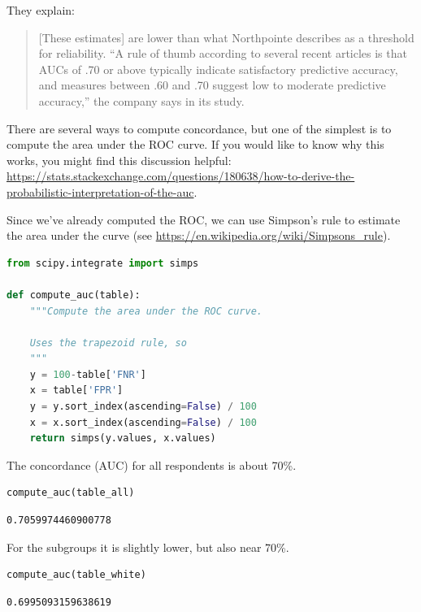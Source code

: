 They explain:

\begin{quote}
{[}These estimates{]} are lower than what Northpointe describes as a
threshold for reliability. ``A rule of thumb according to several recent
articles is that AUCs of .70 or above typically indicate satisfactory
predictive accuracy, and measures between .60 and .70 suggest low to
moderate predictive accuracy,'' the company says in its study.
\end{quote}

There are several ways to compute concordance, but one of the simplest
is to compute the area under the ROC curve. If you would like to know
why this works, you might find this discussion helpful:
\url{https://stats.stackexchange.com/questions/180638/how-to-derive-the-probabilistic-interpretation-of-the-auc}.

Since we've already computed the ROC, we can use Simpson's rule to
estimate the area under the curve (see
\url{https://en.wikipedia.org/wiki/Simpsons_rule}).

\begin{lstlisting}[language=Python,style=source]
from scipy.integrate import simps

def compute_auc(table):
    """Compute the area under the ROC curve.
    
    Uses the trapezoid rule, so 
    """
    y = 100-table['FNR']
    x = table['FPR']
    y = y.sort_index(ascending=False) / 100
    x = x.sort_index(ascending=False) / 100
    return simps(y.values, x.values)
\end{lstlisting}

The concordance (AUC) for all respondents is about 70\%.

\begin{lstlisting}[language=Python,style=source]
compute_auc(table_all)
\end{lstlisting}

\begin{lstlisting}[style=output]
0.7059974460900778
\end{lstlisting}

For the subgroups it is slightly lower, but also near 70\%.

\begin{lstlisting}[language=Python,style=source]
compute_auc(table_white)
\end{lstlisting}

\begin{lstlisting}[style=output]
0.6995093159638619
\end{lstlisting}

